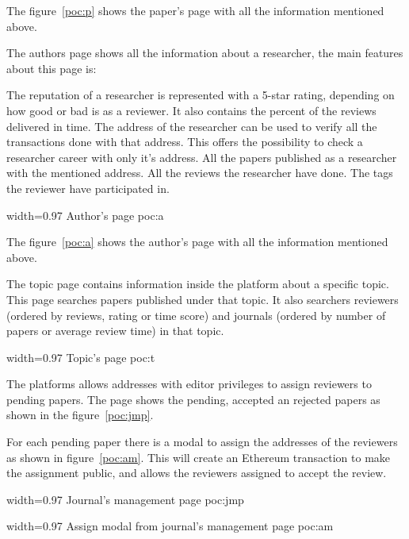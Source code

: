 The figure~\ref{poc:p} shows the paper's page with all the information mentioned
above.


The authors page shows all the information about a researcher, the main features
about this page is:

\begin{itemize}
   The reputation of a researcher is represented with a 5-star
  rating, depending on how good or bad is as a reviewer. It also contains the
  percent of the reviews delivered in time.  The
  address of the researcher can be used to verify all the transactions done with
  that address. This offers the possibility to check a researcher career with
  only it's address.  All the papers published as a
  researcher with the mentioned address.  All the reviews
  the researcher have done.  The tags the reviewer have participated
  in.
\end{itemize}

%
{width=0.97\linewidth}%
{Author's page}%
{poc:a}

The figure~\ref{poc:a} shows the author's page with all the information
mentioned above.


The topic page contains information inside the platform about a specific topic.
This page searches papers published under that topic. It also searchers
reviewers (ordered by reviews, rating or time score) and journals (ordered by
number of papers or average review time) in that topic.

%
{width=0.97\linewidth}%
{Topic's page}%
{poc:t}


The platforms allows addresses with editor privileges to assign reviewers to
pending papers. The page shows the pending, accepted an rejected papers as shown
in the figure~\ref{poc:jmp}.

For each pending paper there is a modal to assign the addresses of the
reviewers as shown in figure~\ref{poc:am}. This will create an Ethereum
transaction to make the assignment public, and allows the reviewers assigned to
accept the review.

%
{width=0.97\linewidth}%
{Journal's management page}%
{poc:jmp}

%
{width=0.97\linewidth}%
{Assign modal from journal's management page}%
{poc:am}


